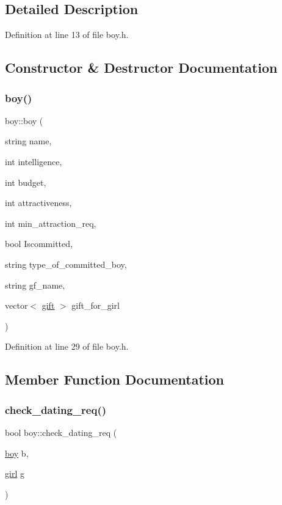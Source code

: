 \subsection{Detailed Description}


Definition at line 13 of file boy.\+h.



\subsection{Constructor \& Destructor Documentation}
\mbox{\label{classboy_a792c56f272dc241a5dad5027c0451a27}} 
\subsubsection{\texorpdfstring{boy()}{boy()}}
{\footnotesize\ttfamily boy\+::boy (\begin{DoxyParamCaption}\item[{string}]{name,  }\item[{int}]{intelligence,  }\item[{int}]{budget,  }\item[{int}]{attractiveness,  }\item[{int}]{min\+\_\+attraction\+\_\+req,  }\item[{bool}]{Iscommitted,  }\item[{string}]{type\+\_\+of\+\_\+committed\+\_\+boy,  }\item[{string}]{gf\+\_\+name,  }\item[{vector$<$ \hyperlink{classgift}{gift} $>$}]{gift\+\_\+for\+\_\+girl }\end{DoxyParamCaption})\hspace{0.3cm}{\ttfamily [inline]}}



Definition at line 29 of file boy.\+h.



\subsection{Member Function Documentation}
\mbox{\label{classboy_a19a486b4a3b1d5334eb481ee7eee4200}} 
\subsubsection{\texorpdfstring{check\+\_\+dating\+\_\+req()}{check\_dating\_req()}}
{\footnotesize\ttfamily bool boy\+::check\+\_\+dating\+\_\+req (\begin{DoxyParamCaption}\item[{\hyperlink{classboy}{boy}}]{b,  }\item[{\hyperlink{classgirl}{girl}}]{g }\end{DoxyParamCaption})}



